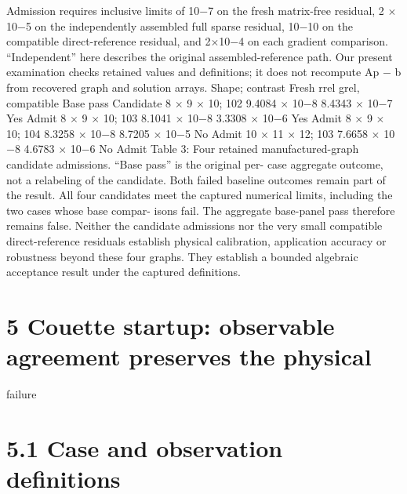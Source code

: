 \documentclass[11pt]{article}
\begin{document}
Admission requires inclusive limits of 10\ensuremath{-}7 on the fresh matrix-free residual, 2 \ensuremath{\times} 10\ensuremath{-}5 on the
independently assembled full sparse residual, 10\ensuremath{-}10 on the compatible direct-reference residual, and
2\ensuremath{\times}10\ensuremath{-}4 on each gradient comparison. “Independent” here describes the original assembled-reference
path. Our present examination checks retained values and definitions; it does not recompute Ap \ensuremath{-} b
from recovered graph and solution arrays.
Shape; contrast Fresh rrel grel, compatible Base pass Candidate
8 \ensuremath{\times} 9 \ensuremath{\times} 10; 102 9.4084 \ensuremath{\times} 10\ensuremath{-}8 8.4343 \ensuremath{\times} 10\ensuremath{-}7 Yes Admit
8 \ensuremath{\times} 9 \ensuremath{\times} 10; 103 8.1041 \ensuremath{\times} 10\ensuremath{-}8 3.3308 \ensuremath{\times} 10\ensuremath{-}6 Yes Admit
8 \ensuremath{\times} 9 \ensuremath{\times} 10; 104 8.3258 \ensuremath{\times} 10\ensuremath{-}8 8.7205 \ensuremath{\times} 10\ensuremath{-}5 No Admit
10 \ensuremath{\times} 11 \ensuremath{\times} 12; 103 7.6658 \ensuremath{\times} 10\ensuremath{-}8 4.6783 \ensuremath{\times} 10\ensuremath{-}6 No Admit
Table 3: Four retained manufactured-graph candidate admissions. “Base pass” is the original per-
case aggregate outcome, not a relabeling of the candidate. Both failed baseline outcomes remain
part of the result.
All four candidates meet the captured numerical limits, including the two cases whose base compar-
isons fail. The aggregate base-panel pass therefore remains false. Neither the candidate admissions
nor the very small compatible direct-reference residuals establish physical calibration, application
accuracy or robustness beyond these four graphs. They establish a bounded algebraic acceptance
result under the captured definitions.

\section*{5 Couette startup: observable agreement preserves the physical}

failure

\section*{5.1 Case and observation definitions}
\end{document}
